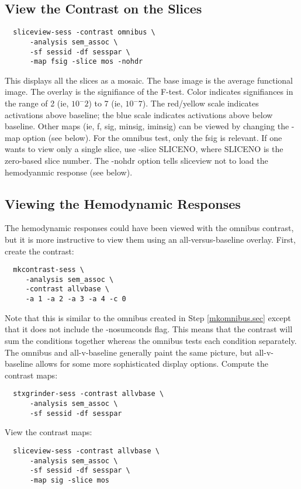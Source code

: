\documentclass[12pt]{article}
\begin{document}
\subsection{View the Contrast on the Slices}
\label{sliceview.sec}

\begin{verbatim}
  sliceview-sess -contrast omnibus \
      -analysis sem_assoc \
      -sf sessid -df sesspar \
      -map fsig -slice mos -nohdr
\end{verbatim}

This displays all the slices as a mosaic. The base image is the
average functional image. The overlay is the signifiance of the
F-test. Color indicates signifiances in the range of 2 (ie, $10^-2$) to
7 (ie, $10^-7$). The red/yellow scale indicates activations above
baseline; the blue scale indicates activations above below baseline.
Other maps (ie, f, sig, minsig, iminsig) can be viewed by changing the
-map option (see below). For the omnibus test, only the fsig is
relevant. If one wants to view only a single slice, use -slice
SLICENO, where SLICENO is the zero-based slice number. The -nohdr
option tells sliceview not to load the hemodyanmic response (see
below).

\subsection{Viewing the Hemodynamic Responses}

The hemodynamic responses could have been viewed with the omnibus
contrast, but it is more instructive to view them using an
all-versus-baseline overlay. First, create the contrast:

\begin{verbatim}
  mkcontrast-sess \
     -analysis sem_assoc \
     -contrast allvbase \
     -a 1 -a 2 -a 3 -a 4 -c 0
\end{verbatim}

Note that this is similar to the omnibus created in Step
\ref{mkomnibus.sec} except that it does not include the -nosumconds
flag. This means that the contrast will sum the conditions together
whereas the omnibus tests each condition separately. The omnibus and
all-v-baseline generally paint the same picture, but all-v-baseline
allows for some more sophisticated display options. Compute the
contrast maps:
\begin{verbatim}
  stxgrinder-sess -contrast allvbase \
      -analysis sem_assoc \
      -sf sessid -df sesspar 
\end{verbatim}
View the contrast maps:
\begin{verbatim}
  sliceview-sess -contrast allvbase \
      -analysis sem_assoc \
      -sf sessid -df sesspar \
      -map sig -slice mos 
\end{verbatim}
\end{document}
